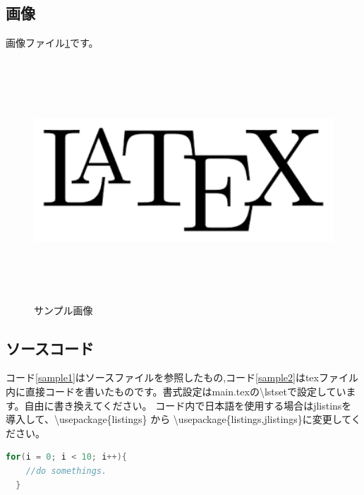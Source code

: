 \subsection{画像}
画像ファイル\ref{figure:sample}です。
\begin{figure}
  \centering
  \includegraphics[width=120mm,height=90mm]{./assets/images/sample.png}
  \caption{サンプル画像}
  \label{figure:sample}
\end{figure}

\subsection{ソースコード}
コード\ref{sample1}はソースファイルを参照したもの,コード\ref{sample2}はtexファイル内に直接コードを書いたものです。書式設定はmain.texの\textbackslash lstsetで設定しています。自由に書き換えてください。
コード内で日本語を使用する場合はjlistinsを導入して、\textbackslash usepackage\{listings\} から \textbackslash usepackage\{listings,jlistings\}に変更してください。



\begin{lstlisting}[language=c,caption=sample2.c,label=sample2]
  for(i = 0; i < 10; i++){
    //do somethings.
  }
\end{lstlisting}
